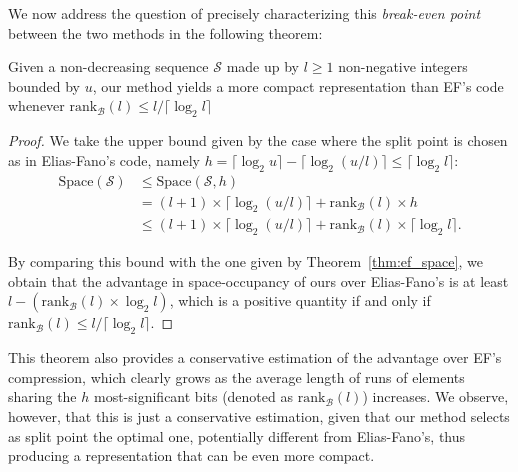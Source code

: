 We now address the question of precisely characterizing this \emph{break-even point} between the two methods in the following theorem:
\begin{theorem}\label{thm:comparison_ef}
    Given a non-decreasing sequence $\mathcal S$ made up by $l \ge 1$  non-negative integers bounded by $u$, our method yields a more compact representation than EF's code whenever $\mathrm{rank}_{\mathcal B}(l) \le l  / \lceil \log_2 l\rceil $
\end{theorem}

\begin{proof}

We take the upper bound given by the case where the split point is chosen as in Elias-Fano's code, namely $h  = \lceil \log_2 u \rceil - \lceil \log_2 (u/l) \rceil \le \lceil \log_2 l\rceil $:
\begin{align*}
    \mathrm{Space}(\mathcal S) &\le \mathrm{Space}(\mathcal S, h) \\
    &= (l + 1)\times  \lceil \log_2(u / l) \rceil + \mathrm{rank}_\mathcal{B}(l)  \times h\\
    & \le (l + 1) \times \lceil \log_2(u / l) \rceil  + \mathrm{rank}_\mathcal{B}(l)  \times \lceil \log_2 l \rceil .
\end{align*}

By comparing this bound with the one given by Theorem~\ref{thm:ef_space}, we obtain that the advantage in space-occupancy of ours over Elias-Fano's is at least $l - (\mathrm{rank}_{\mathcal B}(l) \times \log_2 l)$, which is a positive quantity if and only if $\mathrm{rank}_{\mathcal B}(l) \le l  / \lceil \log_2 l\rceil $.
\end{proof}


This theorem also provides a conservative estimation of the advantage over EF's compression, which clearly grows as the average length of runs of elements sharing the $h$ most-significant bits (denoted as $\mathrm{rank}_{\mathcal B}(l)$) increases. We observe, however, that this is just a conservative estimation, given that our method selects as split point the optimal one, potentially different from Elias-Fano's, thus producing a representation that can be even more compact.


